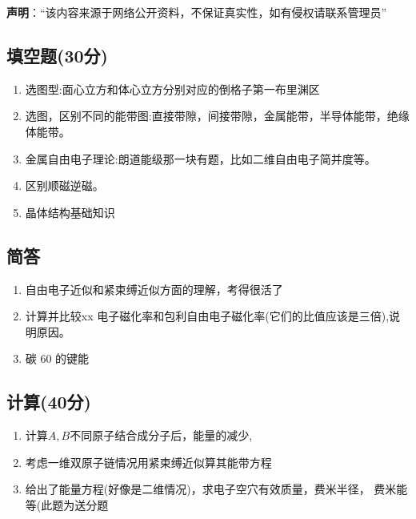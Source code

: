 
\textbf{声明}：“该内容来源于网络公开资料，不保证真实性，如有侵权请联系管理员”

\subsection{填空题(30分)}
\begin{enumerate}
\item 选图型:面心立方和体心立方分别对应的倒格子第一布里渊区
\item 选图，区别不同的能带图:直接带隙，间接带隙，金属能带，半导体能带，绝缘体能带。
\item 金属自由电子理论:朗道能级那一块有题，比如二维自由电子简并度等。
\item 区别顺磁逆磁。
\item 晶体结构基础知识
\end{enumerate}

\subsection{简答}
\begin{enumerate}
\item 自由电子近似和紧束缚近似方面的理解，考得很活了
\item 计算并比较xx 电子磁化率和包利自由电子磁化率(它们的比值应该是三倍),说明原因。
\item 碳 60 的键能
\end{enumerate}
\subsection{计算(40分)}
\begin{enumerate}
\item 计算$A,B$不同原子结合成分子后，能量的减少,
\item 考虑一维双原子链情况用紧束缚近似算其能带方程
\item 给出了能量方程(好像是二维情况)，求电子空穴有效质量，费米半径，
费米能等(此题为送分题
\end{enumerate}
